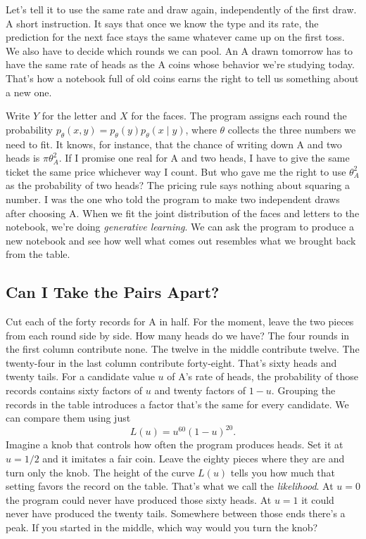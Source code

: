 \documentclass[12pt,oneside]{article}
\newcommand{\secao}[1]{\Needspace{5.2\baselineskip}\subsection*{#1}}
\newcommand{\bookanchor}[1]{\phantomsection\label{#1}}
\begin{document}
Let's tell it to use the same rate and draw again, independently of the first draw. A short instruction. It says that once we know the type and its rate, the prediction for the next face stays the same whatever came up on the first toss. We also have to decide which rounds we can pool. An A drawn tomorrow has to have the same rate of heads as the A coins whose behavior we're studying today. That's how a notebook full of old coins earns the right to tell us something about a new one.

Write\bookanchor{topic-03-1} $Y$ for the letter and $X$ for the faces. The program assigns each round the probability $p_\theta(x,y)=p_\theta(y)p_\theta(x\mid y)$, where $\theta$ collects the three numbers we need to fit. It knows, for instance, that the chance of writing down A and two heads is $\pi\theta_A^2$. If I promise one real for A and two heads, I have to give the same ticket the same price whichever way I count. But who gave me the right to use $\theta_A^2$ as the probability of two heads? The pricing rule says nothing about squaring a number. I was the one who told the program to make two independent draws after choosing A. When we fit the joint distribution of the faces and letters to the notebook, we're doing \emph{generative learning}. We can ask the program to produce a new notebook and see how well what comes out resembles what we brought back from the table.

\secao{Can I Take the Pairs Apart?}
Cut each of the forty records for A in half. For the moment, leave the two pieces from each round side by side. How many heads do we have? The four rounds in the first column contribute none. The twelve in the middle contribute twelve. The twenty-four in the last column contribute forty-eight. That's sixty heads and twenty tails. For a candidate value $u$ of A's rate of heads, the probability of those records contains sixty factors of $u$ and twenty factors of $1-u$. Grouping the records in the table introduces a factor that's the same for every candidate. We can compare them using just
\[
                         L(u)=u^{60}(1-u)^{20}.
\]
Imagine\bookanchor{topic-03-3} a knob that controls how often the program produces heads. Set it at $u=1/2$ and it imitates a fair coin. Leave the eighty pieces where they are and turn only the knob. The height of the curve $L(u)$ tells you how much that setting favors the record on the table. That's what we call the \emph{likelihood}. At $u=0$ the program could never have produced those sixty heads. At $u=1$ it could never have produced the twenty tails. Somewhere between those ends there's a peak. If you started in the middle, which way would you turn the knob?
\end{document}
